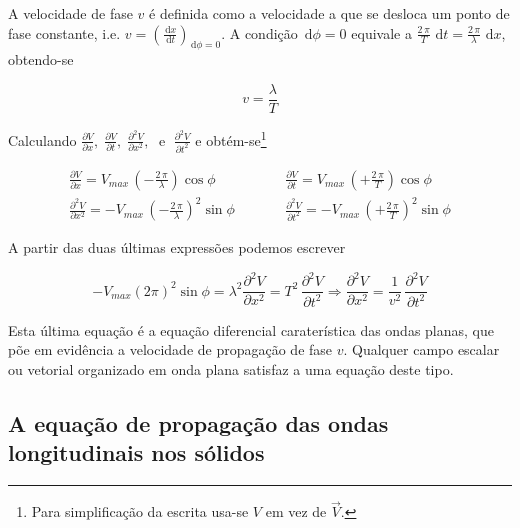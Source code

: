 \documentclass[a4paper,12pt]{article}
\newcommand{\ud}{\,\mathrm{d}}
\begin{document}
A velocidade de fase $v$ é definida como a velocidade a que se desloca um ponto de fase constante, i.e.  $v=(\frac{\ud x}{\ud t})_{\ud \phi=0}$. A condição $\ud \phi = 0$ equivale a $\frac{2\,\pi}{T}\,\ud t = \frac{2\,\pi}{\lambda}\,\ud x$, obtendo-se

\begin{equation}
	\label{eq:v}
	v=\frac{\lambda}{T} 
\end{equation}

Calculando $\frac{\partial V }{\partial x}, \;\frac{\partial V }{\partial t}, \;\frac{\partial^2 V }{\partial x^2}, \; \textrm{ e } \;\frac{\partial^2 V }{\partial t^2} $   e    obtém-se\footnote{Para simplificação da escrita usa-se $V$ em vez de $\vec{V}$. }

\begin{equation}
\begin{array}{ccc}
\frac{\partial V }{\partial x} = V_{max} \, (-\frac{2\,\pi}{\lambda}) \cos \phi &\qquad& \frac{\partial V }{\partial t} = V_{max} \, (+\frac{2\,\pi}{T}) \cos \phi\\
%
\frac{\partial^2 V }{\partial x^2} = -V_{max} \, \left(-\frac{2\,\pi}{\lambda}\right)^2 \sin \phi &\qquad& \frac{\partial^2 V }{\partial t^2} = -V_{max} \, \left(+\frac{2\,\pi}{T}\right)^2 \sin \phi
\end{array}
\end{equation}

A partir das duas últimas expressões podemos escrever

\begin{equation}
	\label{eq:ondap}
-V_{max} (2 \pi)^2  \sin \phi = \lambda^2 \frac{\partial^2 V }{\partial x^2} = T^2 \, \frac{\partial^2 V }{\partial t^2} \Rightarrow 
\frac{\partial^2 V }{\partial x^2} = \frac{1}{v^2}  \, \frac{\partial^2 V }{\partial t^2}
\end{equation}

Esta última equação é a equação diferencial caraterística das ondas planas, que põe em evidência a velocidade de propagação de fase $v$. Qualquer campo escalar ou vetorial organizado em onda plana satisfaz a uma equação deste tipo.

\subsection{\sf A equação de propagação das ondas longitudinais nos sólidos} 
\end{document}
